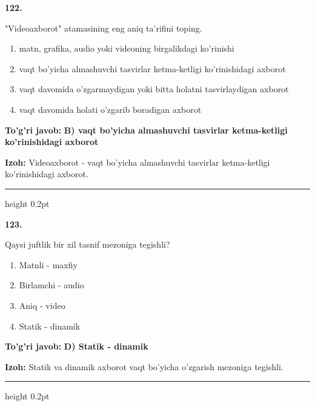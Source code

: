 \documentclass[10pt,a4paper,oneside]{article}
\begin{document}
\noindent\textbf{\color{ink}122.}
\par
"Videoaxborot" atamasining eng aniq ta'rifini toping.
\begin{enumerate}[label=\Alph*),leftmargin=9mm]
\item matn, grafika, audio yoki videoning birgalikdagi ko'rinishi
\item vaqt bo'yicha almashuvchi tasvirlar ketma-ketligi ko'rinishidagi axborot
\item vaqt davomida o'zgarmaydigan yoki bitta holatni tasvirlaydigan axborot
\item vaqt davomida holati o'zgarib boradigan axborot
\end{enumerate}
\begin{tcolorbox}[enhanced,breakable,colback=teal!4,colframe=teal!50!black,boxrule=0.5pt,arc=1.1mm,left=3mm,right=3mm,top=1.7mm,bottom=1.7mm,before skip=2mm,after skip=2mm]
\textbf{\color{teal}To'g'ri javob:} \textbf{B) vaqt bo'yicha almashuvchi tasvirlar ketma-ketligi ko'rinishidagi axborot}
\par\smallskip
\textbf{Izoh:} Videoaxborot - vaqt bo'yicha almashuvchi tasvirlar ketma-ketligi ko'rinishidagi axborot.
\end{tcolorbox}
\vspace{2mm}\hrule height 0.2pt \vspace{3mm}

\noindent\textbf{\color{ink}123.}
\par
Qaysi juftlik bir xil tasnif mezoniga tegishli?
\begin{enumerate}[label=\Alph*),leftmargin=9mm]
\item Matnli - maxfiy
\item Birlamchi - audio
\item Aniq - video
\item Statik - dinamik
\end{enumerate}
\begin{tcolorbox}[enhanced,breakable,colback=teal!4,colframe=teal!50!black,boxrule=0.5pt,arc=1.1mm,left=3mm,right=3mm,top=1.7mm,bottom=1.7mm,before skip=2mm,after skip=2mm]
\textbf{\color{teal}To'g'ri javob:} \textbf{D) Statik - dinamik}
\par\smallskip
\textbf{Izoh:} Statik va dinamik axborot vaqt bo'yicha o'zgarish mezoniga tegishli.
\end{tcolorbox}
\vspace{2mm}\hrule height 0.2pt \vspace{3mm}
\end{document}

